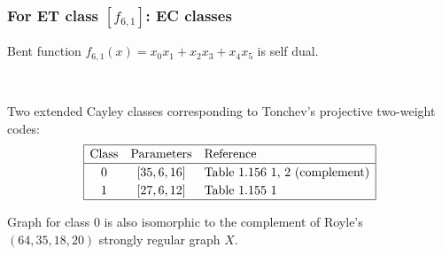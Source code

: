 \documentclass[pdf,sprung,slideColor,nocolorBG]{beamer}
\newenvironment{colortheme}[1]{
\def\ProvidesPackageRCS $##1${\relax}
\renewcommand{\ProcessOptions}{\relax}
\makeatletter

\makeatother
}{}
\begin{document}
\begin{colortheme}{jubata}

\begin{frame}
\frametitle{For ET class $[f_{6,1}]$: EC classes}

Bent function
$f_{6,1}(x) = x_0 x_1 + x_2 x_3 + x_4 x_5$ is self dual.

 ~

Two extended Cayley classes corresponding to Tonchev's projective two-weight codes:
\begin{align*}
\def\arraystretch{1.2}
\begin{array}{|ccl|}
\hline
\text{Class} &
\text{Parameters} & \text{Reference}
\\
\hline
0 & [35,6,16] & \text{Table 1.156 1, 2 (complement)}
\\
1 & [27,6,12] & \text{Table 1.155 1 }
\\
\hline
\end{array}
\end{align*}

Graph for class 0 is also isomorphic to the complement of Royle's $(64,35,18,20)$ strongly regular
graph $X$.


\end{frame}
\end{colortheme}
\end{document}
